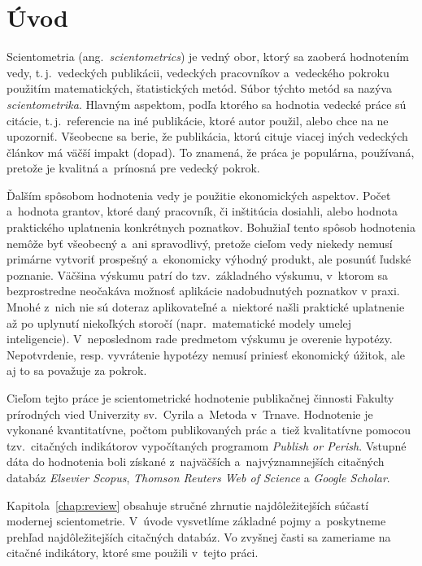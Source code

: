 \chapter*{Úvod}

Scientometria (ang.~\emph{scientometrics}) je vedný obor, ktorý sa zaoberá
hodnotením vedy, t.\,j.~vedeckých publikácii, vedeckých pracovníkov a~vedeckého
pokroku použitím matematických, štatistických metód.  Súbor týchto metód sa
nazýva \emph{scientometrika}.  Hlavným aspektom, podľa ktorého sa hodnotia
vedecké práce sú citácie, t.\,j.~referencie na iné publikácie, ktoré autor
použil, alebo chce na ne upozorniť.  Všeobecne sa berie, že publikácia, ktorú
cituje viacej iných vedeckých článkov má väčší impakt (dopad).  To znamená, že
práca je populárna, používaná, pretože je kvalitná a~prínosná pre vedecký
pokrok.

Ďalším spôsobom hodnotenia vedy je použitie ekonomických aspektov.  Počet
a~hodnota grantov, ktoré daný pracovník, či inštitúcia dosiahli, alebo hodnota
praktického uplatnenia konkrétnych poznatkov.  Bohužiaľ tento spôsob hodnotenia
nemôže byť všeobecný a~ani spravodlivý, pretože cieľom vedy niekedy nemusí
primárne vytvoriť prospešný a~ekonomicky výhodný produkt, ale posunúť ľudské
poznanie.  Väčšina výskumu patrí do tzv.~základného výskumu, v~ktorom sa
bezprostredne neočakáva možnosť aplikácie nadobudnutých poznatkov v praxi.
Mnohé z~nich nie sú doteraz aplikovateľné a~niektoré našli praktické uplatnenie
až po uplynutí niekoľkých storočí (napr.~matematické modely umelej
inteligencie).  V~neposlednom rade predmetom výskumu je overenie hypotézy.
Nepotvrdenie, resp. vyvrátenie hypotézy nemusí priniesť ekonomický úžitok,
ale aj to sa považuje za pokrok.

Cieľom tejto práce je scientometrické hodnotenie publikačnej činnosti Fakulty
prírodných vied Univerzity sv.~Cyrila a~Metoda v~Trnave.  Hodnotenie je
vykonané kvantitatívne, počtom publikovaných prác a~tiež kvalitatívne pomocou
tzv.~citačných indikátorov vypočítaných programom \emph{Publish or Perish}.
Vstupné dáta do hodnotenia boli získané z~najväčších a~najvýznamnejších
citačných databáz \emph{Elsevier Scopus}, \emph{Thomson Reuters Web of Science}
a \emph{Google Scholar}.

Kapitola~\ref{chap:review} obsahuje stručné zhrnutie najdôležitejších súčastí
modernej scientometrie.  V~úvode vysvetlíme základné pojmy a~poskytneme prehľad
najdôležitejších citačných databáz.  Vo zvyšnej časti sa zameriame na citačné
indikátory, ktoré sme použili v~tejto práci.

